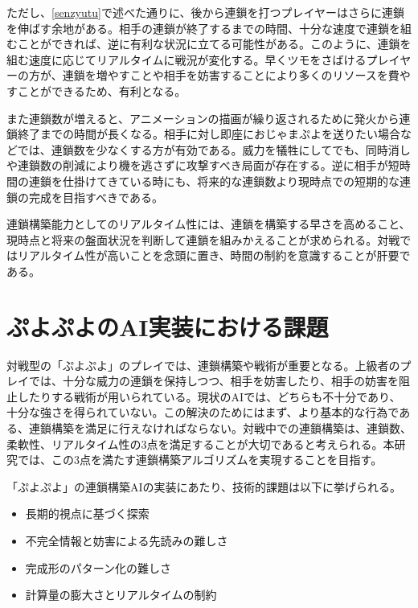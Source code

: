 \documentclass[12pt]{jreport}
\begin{document}
ただし、\ref{senzyutu}で述べた通りに、後から連鎖を打つプレイヤーはさらに連鎖を伸ばす余地がある。相手の連鎖が終了するまでの時間、十分な速度で連鎖を組むことができれば、逆に有利な状況に立てる可能性がある。このように、連鎖を組む速度に応じてリアルタイムに戦況が変化する。早くツモをさばけるプレイヤーの方が、連鎖を増やすことや相手を妨害することにより多くのリソースを費やすことができるため、有利となる。


また連鎖数が増えると、アニメーションの描画が繰り返されるために発火から連鎖終了までの時間が長くなる。相手に対し即座におじゃまぷよを送りたい場合などでは、連鎖数を少なくする方が有効である。威力を犠牲にしてでも、同時消しや連鎖数の削減により機を逃さずに攻撃すべき局面が存在する。逆に相手が短時間の連鎖を仕掛けてきている時にも、将来的な連鎖数より現時点での短期的な連鎖の完成を目指すべきである。

連鎖構築能力としてのリアルタイム性には、連鎖を構築する早さを高めること、現時点と将来の盤面状況を判断して連鎖を組みかえることが求められる。対戦ではリアルタイム性が高いことを念頭に置き、時間の制約を意識することが肝要である。

\section{ぷよぷよのAI実装における課題}
対戦型の「ぷよぷよ」のプレイでは、連鎖構築や戦術が重要となる。上級者のプレイでは、十分な威力の連鎖を保持しつつ、相手を妨害したり、相手の妨害を阻止したりする戦術が用いられている。現状のAIでは、どちらも不十分であり、十分な強さを得られていない。この解決のためにはまず、より基本的な行為である、連鎖構築を満足に行えなければならない。対戦中での連鎖構築は、連鎖数、柔軟性、リアルタイム性の3点を満足することが大切であると考えられる。本研究では、この3点を満たす連鎖構築アルゴリズムを実現することを目指す。

「ぷよぷよ」の連鎖構築AIの実装にあたり、技術的課題は以下に挙げられる。
\begin{itemize}
\item 長期的視点に基づく探索
\item 不完全情報と妨害による先読みの難しさ
\item 完成形のパターン化の難しさ
\item 計算量の膨大さとリアルタイムの制約
\end{itemize}
\end{document}
